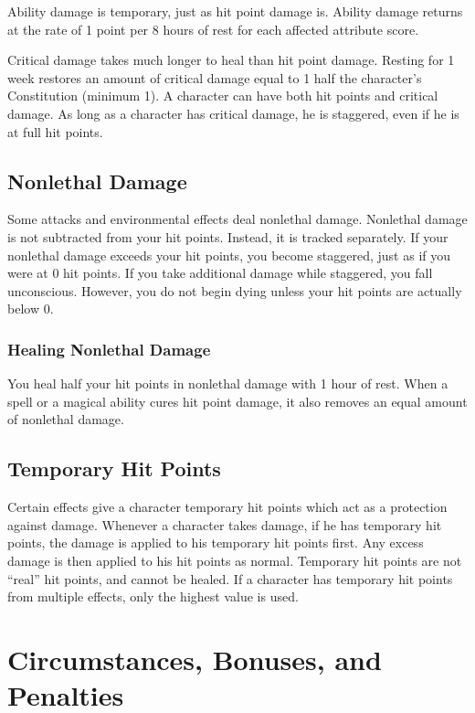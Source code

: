  Ability damage is temporary, just as hit point damage is. Ability damage returns at the rate of 1 point per 8 hours of rest for each affected attribute score.

 Critical damage takes much longer to heal than hit point damage. Resting for 1 week restores an amount of critical damage equal to 1 \add half the character's Constitution (minimum 1). A character can have both hit points and critical damage. As long as a character has critical damage, he is staggered, even if he is at full hit points.

\subsection{Nonlethal Damage}\label{Nonlethal Damage}
Some attacks and environmental effects deal nonlethal damage. Nonlethal damage is not subtracted from your hit points. Instead, it is tracked separately. If your nonlethal damage exceeds your hit points, you become staggered, just as if you were at 0 hit points. If you take additional damage while staggered, you fall unconscious. However, you do not begin dying unless your hit points are actually below 0. 

\subsubsection{Healing Nonlethal Damage}
You heal half your hit points in nonlethal damage with 1 hour of rest. When a spell or a magical ability cures hit point damage, it also removes an equal amount of nonlethal damage.

\subsection{Temporary Hit Points}\label{Temporary Hit Points}
Certain effects give a character temporary hit points which act as a protection against damage. Whenever a character takes damage, if he has temporary hit points, the damage is applied to his temporary hit points first. Any excess damage is then applied to his hit points as normal. Temporary hit points are not ``real'' hit points, and cannot be healed. If a character has temporary hit points from multiple effects, only the highest value is used.

\section{Circumstances, Bonuses, and Penalties}

